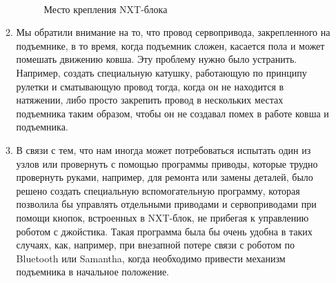 \begin{enumerate}
\begin{enumerate}
		\begin{figure}[H]
			\begin{minipage}[h]{0.2\linewidth}
				\center  
			\end{minipage}
			\begin{minipage}[h]{0.6\linewidth}
				\caption{Место крепления NXT-блока}
			\end{minipage}
		\end{figure}
		
		\item Мы обратили внимание на то, что провод сервопривода, закрепленного на подъемнике, в то время, когда подъемник сложен, касается пола и может помешать движению ковша. Эту проблему нужно было устранить. Например, создать специальную катушку, работающую по принципу рулетки и сматывающую провод тогда, когда он не находится в натяжении, либо просто закрепить провод в нескольких местах подъемника таким образом, чтобы он не создавал помех в работе ковша и подъемника.
		
		\item В связи с тем, что нам иногда может потребоваться испытать один из узлов или провернуть с помощью программы приводы, которые трудно провернуть руками, например, для ремонта или замены деталей, было решено создать специальную вспомогательную программу, которая позволила бы управлять отдельными приводами и сервоприводами при помощи кнопок, встроенных в NXT-блок, не прибегая к управлению роботом с джойстика. Такая программа была бы очень удобна в таких случаях, как, например, при внезапной потере связи с роботом по Bluetooth или Samantha, когда необходимо привести механизм подъемника в начальное положение.
		

\end{enumerate}
\end{enumerate}
